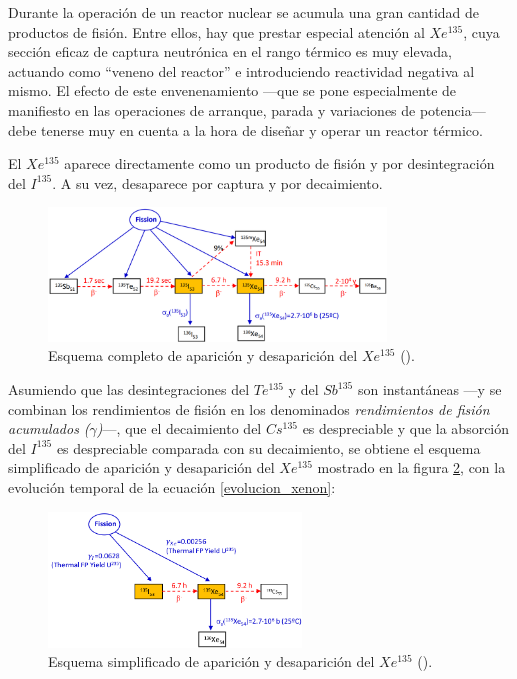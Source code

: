 Durante la operación de un reactor nuclear se acumula una gran cantidad de productos de fisión. Entre ellos, hay que prestar especial atención al $Xe^{135}$, cuya sección eficaz de captura neutrónica en el rango térmico es muy elevada, actuando como ``veneno del reactor'' e introduciendo reactividad negativa al mismo. El efecto de este envenenamiento ---que se pone especialmente de manifiesto en las operaciones de arranque, parada y variaciones de potencia--- debe tenerse muy en cuenta a la hora de diseñar y operar un reactor térmico.

El $Xe^{135}$ aparece directamente como un producto de fisión y por desintegración del $I^{135}$. A su vez, desaparece por captura y por decaimiento.

\begin{figure}[h]
  \centering
  \includegraphics[width=0.8\textwidth]{content/figures/esquema_xenon.png}
  \caption{Esquema completo de aparición y desaparición del $Xe^{135}$ (\cite{apuntes_centrales}).}
  \label{fig:esquema_xenon}
\end{figure}

Asumiendo que las desintegraciones del $Te^{135}$ y del $Sb^{135}$ son instantáneas ---y se combinan los rendimientos de fisión en los denominados \textit{rendimientos de fisión acumulados ($\gamma$)}---, que el decaimiento del $Cs^{135}$ es despreciable y que la absorción del $I^{135}$ es despreciable comparada con su decaimiento, se obtiene el esquema simplificado de aparición y desaparición del $Xe^{135}$ mostrado en la figura \ref{fig:esquema_xenon_simplificado}, con la evolución temporal de la ecuación \ref{evolucion_xenon}:

\begin{figure}[!h]
  \centering
  \includegraphics[width=0.6\textwidth]{content/figures/esquema_xenon_simplificado.png}
  \caption{Esquema simplificado de aparición y desaparición del $Xe^{135}$ (\cite{apuntes_centrales}).}
  \label{fig:esquema_xenon_simplificado}
\end{figure}

